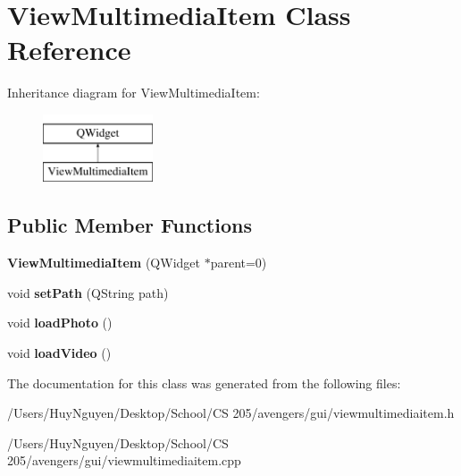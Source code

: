 \hypertarget{classViewMultimediaItem}{}\section{View\+Multimedia\+Item Class Reference}
\label{classViewMultimediaItem}
Inheritance diagram for View\+Multimedia\+Item\+:\begin{figure}[H]
\begin{center}
\leavevmode
\includegraphics[height=2.000000cm]{classViewMultimediaItem}
\end{center}
\end{figure}
\subsection*{Public Member Functions}
\begin{DoxyCompactItemize}
\item 
{\bfseries View\+Multimedia\+Item} (Q\+Widget $\ast$parent=0)\hypertarget{classViewMultimediaItem_a55d2e4e02dbd1c11a40116bef6a1a66e}{}\label{classViewMultimediaItem_a55d2e4e02dbd1c11a40116bef6a1a66e}

\item 
void {\bfseries set\+Path} (Q\+String path)\hypertarget{classViewMultimediaItem_aeb748f8fc3e339256564bee2c84106d0}{}\label{classViewMultimediaItem_aeb748f8fc3e339256564bee2c84106d0}

\item 
void {\bfseries load\+Photo} ()\hypertarget{classViewMultimediaItem_a1124a4b17f6af990db4a824f4495459e}{}\label{classViewMultimediaItem_a1124a4b17f6af990db4a824f4495459e}

\item 
void {\bfseries load\+Video} ()\hypertarget{classViewMultimediaItem_a79b656cd7c04b1db73356003dedb0cea}{}\label{classViewMultimediaItem_a79b656cd7c04b1db73356003dedb0cea}

\end{DoxyCompactItemize}


The documentation for this class was generated from the following files\+:\begin{DoxyCompactItemize}
\item 
/\+Users/\+Huy\+Nguyen/\+Desktop/\+School/\+C\+S 205/avengers/gui/viewmultimediaitem.\+h\item 
/\+Users/\+Huy\+Nguyen/\+Desktop/\+School/\+C\+S 205/avengers/gui/viewmultimediaitem.\+cpp\end{DoxyCompactItemize}
